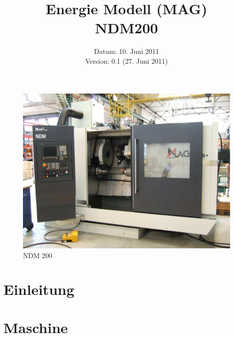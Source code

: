 \documentclass[a4paper,11pt,pdftex,twoside]{scrartcl}
\title{Energie Modell (MAG)\\NDM200}
\date{Datum: 10. Juni 2011 \\
Version: 0.1  (27. Juni 2011)}
\begin{document}
\maketitle
\thispagestyle{empty} %
\begin{figure}[htbp]
\begin{center}
  \includegraphics[width=0.7\columnwidth]{Bilder/NDM200.jpg}
  \caption*{NDM 200}
\end{center}
\end{figure}

\clearpage

\thispagestyle{empty} %
\tableofcontents
\clearpage

\setcounter{page}{1}   %

\section{Einleitung}



\section{Maschine}
\end{document}
